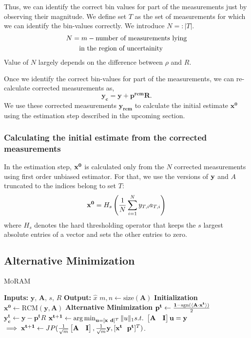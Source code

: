 Thus, we can identify the correct bin values for part of the measurements just by observing their magnitude. We define set $T$ as the set of measurements for which we can identify the bin-values correctly. We introduce $N=:|T|$.
\begin{align*}
N & =  m - \textnormal{number of measurements lying} \\
     &~~~\textnormal{in the region of uncertainity}
\end{align*}
Value of $N$ largely depends on the difference between $\rho$ and $R$.

Once we identify the correct bin-values for part of the measurements, we can re-calculate corrected measurements as,
$$
\mathbf{y_{c} = y + p^{rcm}R}.
$$
We use these corrected measurements $\mathbf{y_{rcm}}$ to calculate the initial estimate $\mathbf{{x}^0}$ using the estimation step described in the upcoming section.
\subsubsection{Calculating the initial estimate from the corrected measurements}
In the estimation step, $\mathbf{x^0}$ is calculated only from the $N$ corrected measurements using first order unbiased estimator. For that, we use the versions of $\mathbf{y}$ and $A$ truncated to the indices belong to set $T$:
\begin{equation}
\mb{x^0} = H_s\left( \frac{1}{N}\sum_{i=1}^{N}y_{T,i}a_{T,i}\right)
\label{eq:init}
\end{equation}
where $H_s$ denotes the hard thresholding operator that keeps the $s$ largest absolute entries of a vector and sets the other entries to zero.
\subsection{Alternative Minimization}
\label{sec:altmin}
\begin{algorithm}[H]
	\caption{\textsc{MoRAM}}
	\label{alg:MoRAM}
	\begin{algorithmic}
		\State\textbf{Inputs:} $\mathbf{y}$, $\mathbf{A}$, $s$, $R$
		\State\textbf{Output:}  $\widehat{x}$
		\State $m,n \leftarrow \mathrm{size}(\mathbf{A})$ 
		\State \textbf{Initialization}
		\State $\mathbf{x^0} \leftarrow \textrm{RCM}(\mathbf{y, A})$ 
		\State \textbf{Alternative Minimization}
		\State $\mathbf{{p}^{t}} \leftarrow \frac{\mathbf{1}-\mathrm{sgn}(\langle \mathbf{A} \cdot \mathbf{x^t} \rangle)}{2}$
		\State $\mathbf{y^t_c} \leftarrow \mathbf{y} - \mathbf{p^t}R$
		\State $\mathbf{{x}^{t+1}}\leftarrow \operatorname*{arg\,min}_{\mathbf{u}=[\mathbf{x~d}]^T}\|u\|_1  s.t.~ \begin{bmatrix} \mathbf{A} & \mathbf{I} \end{bmatrix}\mathbf{u} = \mathbf{y}$ 
		\State $\implies \mathbf{{x}^{t+1}}\leftarrow \small{JP(\frac{1}{\sqrt{m}}\begin{bmatrix} \mathbf{A} & \mathbf{I} \end{bmatrix},\frac{1}{\sqrt{m}}\mathbf{y},[\mathbf{x^t~~p^t}]^T)}$.
		\EndFor
	\end{algorithmic}
\end{algorithm}


